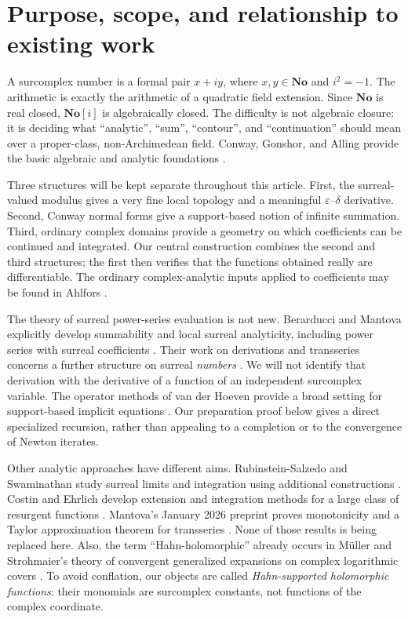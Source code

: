 \documentclass[11pt,letterpaper]{article}
\numberwithin{equation}{section}
\theoremstyle{definition}
\theoremstyle{remark}
\newcommand{\No}{\mathbf{No}}
\begin{document}
\section{Purpose, scope, and relationship to existing work}\label{sec:introduction}

A surcomplex number is a formal pair $x+iy$, where $x,y\in\No$ and $i^2=-1$.
The arithmetic is exactly the arithmetic of a quadratic field extension.
Since $\No$ is real closed, $\No[i]$ is algebraically closed. The difficulty is
not algebraic closure: it is deciding what ``analytic'', ``sum'', ``contour'',
and ``continuation'' should mean over a proper-class, non-Archimedean field.
Conway, Gonshor, and Alling provide the basic algebraic and analytic foundations
\cite{Conway,Gonshor,Alling}.

Three structures will be kept separate throughout this article. First, the
surreal-valued modulus gives a very fine local topology and a meaningful
$\varepsilon$--$\delta$ derivative. Second, Conway normal forms give a
support-based notion of infinite summation. Third, ordinary complex domains
provide a geometry on which coefficients can be continued and integrated.
Our central construction combines the second and third structures; the first
then verifies that the functions obtained really are differentiable. The
ordinary complex-analytic inputs applied to coefficients may be found in
Ahlfors \cite{Ahlfors}.

The theory of surreal power-series evaluation is not new. Berarducci and
Mantova explicitly develop summability and local surreal analyticity, including
power series with surreal coefficients \cite[Section 3]{BMgerms}. Their work
on derivations and transseries concerns a further structure on surreal
\emph{numbers} \cite{BMderivations}. We will not identify that derivation with
the derivative of a function of an independent surcomplex variable. The
operator methods of van der Hoeven provide a broad setting for support-based
implicit equations \cite{vdH}. Our preparation proof below gives a direct
specialized recursion, rather than appealing to a completion or to the
convergence of Newton iterates.

Other analytic approaches have different aims. Rubinstein-Salzedo and
Swaminathan study surreal limits and integration using additional constructions
\cite{RSS}. Costin and Ehrlich develop extension and integration methods for a
large class of resurgent functions \cite{CE}. Mantova's January 2026 preprint
proves monotonicity and a Taylor approximation theorem for transseries
\cite{Mantova2026}. None of those results is being replaced here. Also, the
term ``Hahn-holomorphic'' already occurs in M\"uller and Strohmaier's theory of
convergent generalized expansions on complex logarithmic covers \cite{MS}.
To avoid conflation, our objects are called \emph{Hahn-supported holomorphic
functions}: their monomials are surcomplex constants, not functions of the
complex coordinate.
\end{document}
